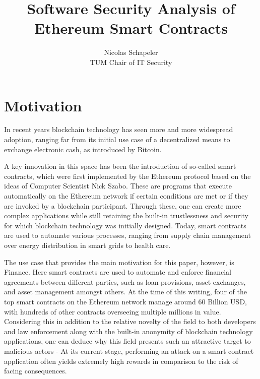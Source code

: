 \documentclass[letterpaper,twocolumn,10pt]{article}
\begin{document}

\date{}

\title{\Large \bf Software Security Analysis of Ethereum Smart Contracts}

\author{
{\rm Nicolas Schapeler}\\
TUM Chair of IT Security
} %

\maketitle

\begin{abstract}
\end{abstract}


\section{Motivation}
In recent years blockchain technology has seen more and more widespread adoption, ranging far from its initial use case of a decentralized means to exchange electronic cash, as introduced by Bitcoin. 

A key innovation in this space has been the introduction of so-called smart contracts, which were first implemented by the Ethereum protocol based on the ideas of Computer Scientist Nick Szabo. These are programs that execute automatically on the Ethereum network if certain conditions are met or if they are invoked by a blockchain participant. Through these, one can create more complex applications while still retaining the built-in trustlessness and security for which blockchain technology was initially designed. Today, smart contracts are used to automate various processes, ranging from supply chain management over energy distribution in smart grids to health care. 

The use case that provides the main motivation for this paper, however, is Finance. Here smart contracts are used to automate and enforce financial agreements between different parties, such as loan provisions, asset exchanges, and asset management amongst others. At the time of this writing, four of the top smart contracts on the Ethereum network manage around 60 Billion USD, with hundreds of other contracts overseeing multiple millions in value. Considering this in addition to the relative novelty of the field to both developers and law enforcement along with the built-in anonymity of blockchain technology applications, one can deduce why this field presents such an attractive target to malicious actors - At its current stage, performing an attack on a smart contract application often yields extremely high rewards in comparison to the risk of facing consequences. 
\end{document}
